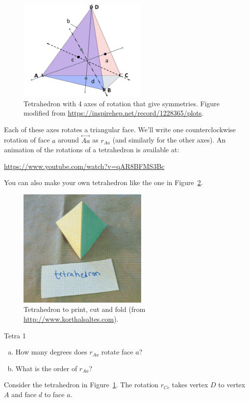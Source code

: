 \begin{figure}[ht]
\begin{center}
\includegraphics[width=2.5in]{images/TetrahedronC.png}
\caption{\label{fig:TetRot}Tetrahedron with 4 axes of rotation that give symmetries. Figure modified  from \url{https://inspirehep.net/record/1228365/plots}.}
\end{center}
\end{figure}


Each of these axes rotates a triangular face. We'll write one counterclockwise rotation of face $a$ around $\overset{\leftrightarrow}{Aa}$ as $r_{Aa}$ (and similarly for the other axes).
An animation of the rotations of a tetrahedron is available at:

\url{https://www.youtube.com/watch?v=qAR8BFMS3Bc}

You can also make your own tetrahedron like the one in Figure~\ref{fig:TetraFold}.

\begin{figure}[ht]
\begin{center}
\includegraphics[width=2.5in]{images/TetrahedronFold.png}
\caption{\label{fig:TetraFold}Tetrahedron to print, cut and fold 
(from \url{http://www.korthalsaltes.com}).}
 
\end{center}
\end{figure}

\begin{exercise}{Tetra 1}
\begin{enumerate}[(a)]
\item How many degrees does $ r_{Aa}$ rotate face $a$?
\item What is the order of $r_{Aa}$?
\end{enumerate}

\end{exercise}
Consider the tetrahedron in Figure~\ref{fig:TetRot}.  The rotation $r_{Cc}$ takes vertex $D$ to vertex $A$ and face $d$ to face $a$.  

